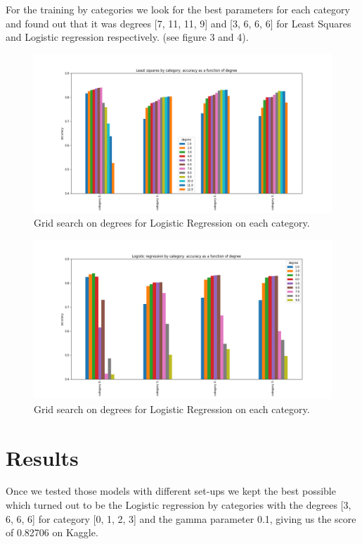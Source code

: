 \documentclass[10pt,conference,compsocconf]{IEEEtran}
\begin{document}
For the training by categories we look for the best parameters for each category and found out that it was degrees [7, 11, 11, 9] and [3, 6, 6, 6] for Least Squares and Logistic regression respectively. (see figure 3 and 4).
\begin{figure}[tbp]
  \centering
  \includegraphics[width=\columnwidth]{ls_cat_deg}
  \caption{Grid search on degrees for Logistic Regression on each category.}
  \vspace{-3mm}
  \label{fig:denoise-fourier}
\end{figure}
\begin{figure}[tbp]
  \centering
  \includegraphics[width=\columnwidth]{lr_cat_deg}
  \caption{Grid search on degrees for Logistic Regression on each category.}
  \vspace{-3mm}
  \label{fig:denoise-fourier}
\end{figure}
\section{Results}

Once we tested those models with different set-ups we kept the best possible which turned out to be the Logistic regression by categories with the degrees [3, 6, 6, 6] for category [0, 1, 2, 3] and the gamma parameter 0.1, giving us the score of 0.82706 on Kaggle.
\end{document}
